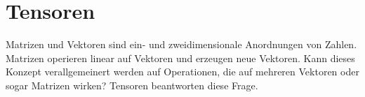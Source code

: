 %
%
%
\chapter{Tensoren}
\rhead{}
Matrizen und Vektoren sind ein- und zweidimensionale Anordnungen von
Zahlen.
Matrizen operieren linear auf Vektoren und erzeugen neue Vektoren.
Kann dieses Konzept verallgemeinert werden auf Operationen, die
auf mehreren Vektoren oder sogar Matrizen wirken?
Tensoren beantworten diese Frage.







